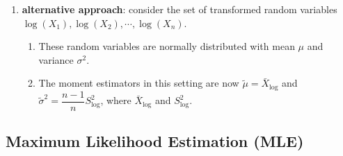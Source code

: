 \begin{enumerate}
    \item \textbf{alternative approach}: consider the set of transformed random variables $\log (X_1), \log (X_2) , \cdots , \log (X _n )$.
    \hfill \cite{statistics/book/Statistics-for-Data-Scientists/Maurits-Kaptein}
    \begin{enumerate}
        \item These random variables are normally distributed with mean $\mu$ and variance $\sigma^ 2$.
        \hfill \cite{statistics/book/Statistics-for-Data-Scientists/Maurits-Kaptein}

        \item The moment estimators in this setting are now $\tilde{\mu} = \bar{X}_{\log}$ and $\tilde{\sigma}^ 2 = \dfrac{n - 1}{n}S^2 _{\log}$, where $\bar{X}_{\log}$ and $S^2 _{\log} $.
        \hfill \cite{statistics/book/Statistics-for-Data-Scientists/Maurits-Kaptein}
    \end{enumerate}

\end{enumerate}





\subsection{Maximum Likelihood Estimation (MLE)}

